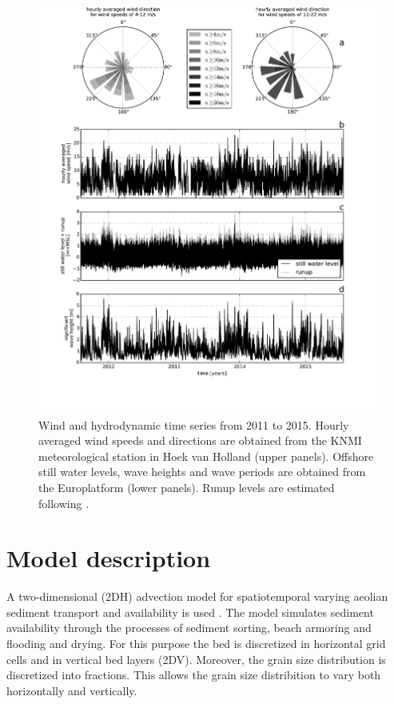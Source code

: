\begin{figure}
  \centering
  \includegraphics[width=\columnwidth]{../Figures/boundaryconditions}
  \caption{Wind and hydrodynamic time series from 2011 to 2015. Hourly
    averaged wind speeds and directions are obtained from the KNMI
    meteorological station in Hoek van Holland (upper
    panels). Offshore still water levels, wave heights and wave
    periods are obtained from the Europlatform (lower panels). Runup
    levels are estimated following \citet{Stockdon2006}.}
  \label{fig:boundaryconditions}
\end{figure}

\section{Model description}

A two-dimensional (2DH) advection model for spatiotemporal varying
aeolian sediment transport and availability is used
\citep{Hoonhout2016}. The model simulates sediment availability
through the processes of sediment sorting, beach armoring and flooding
and drying. For this purpose the bed is discretized in horizontal grid
cells and in vertical bed layers (2DV). Moreover, the grain size
distribution is discretized into fractions. This allows the grain size
distribition to vary both horizontally and vertically.

